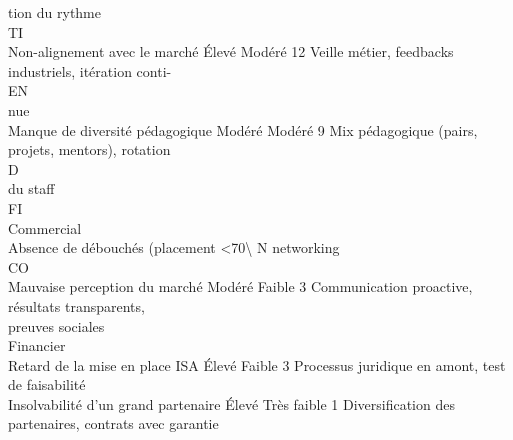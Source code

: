 tion du rythme\\
\vspace{0.5em}
\vspace{0.5em}
\vspace{0.5em}
\vspace{0.5em}
TI\\
Non-alignement avec le marché                         Élevé     Modéré        12   Veille métier, feedbacks industriels, itération conti-\\
\vspace{0.5em}
\vspace{0.5em}
\vspace{0.5em}
\vspace{0.5em}
EN\\
nue\\
Manque de diversité pédagogique                      Modéré     Modéré        9    Mix pédagogique (pairs, projets, mentors), rotation\\
\vspace{0.5em}
\vspace{0.5em}
\vspace{0.5em}
\vspace{0.5em}
D\\
du staff\\
\vspace{0.5em}
\vspace{0.5em}
\vspace{0.5em}
\vspace{0.5em}
FI\\
Commercial\\
Absence de débouchés (placement \textless{}70\textbackslash{}%
N                                  networking\\
CO\\
Mauvaise perception du marché                        Modéré     Faible        3    Communication proactive, résultats transparents,\\
preuves sociales\\
Financier\\
Retard de la mise en place ISA                        Élevé     Faible        3    Processus juridique en amont, test de faisabilité\\
Insolvabilité d’un grand partenaire                   Élevé   Très faible     1    Diversification des partenaires, contrats avec garantie\\
